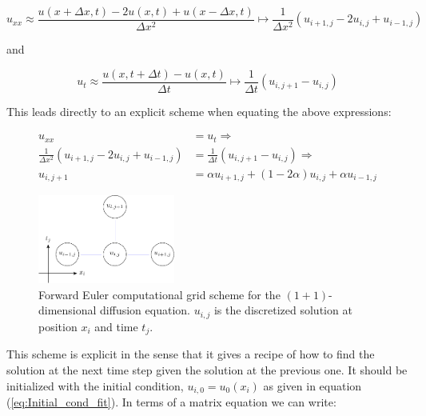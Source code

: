\documentclass[a4paper, 11pt, notitlepage,english]{article}
\begin{document}
\begin{equation}
u_{xx} \approx \frac{u(x+\Delta x,t)-2u(x,t)+u(x-\Delta x, t)}{\Delta x^2} \mapsto \frac{1}{\Delta x^2} (u_{i+1,j}-2u_{i,j}+u_{i-1,j})
\label{eq:Forward_uxx}
\end{equation}

and

\begin{equation}
u_{t} \approx \frac{u(x,t+\Delta t)-u(x, t)}{\Delta t} \mapsto \frac{1}{\Delta t} (u_{i,j+1}-u_{i,j})
\label{eq:Forward_ut}
\end{equation}

This leads directly to an explicit scheme when equating the above expressions:

\begin{align}
u_{xx} &= u_t \Rightarrow \\
 \frac{1}{\Delta x^2} (u_{i+1,j}-2u_{i,j}+u_{i-1,j}) &= \frac{1}{\Delta t} (u_{i,j+1}-u_{i,j}) \Rightarrow \\
 u_{i,j+1} &= \alpha u_{i+1,j} + (1-2\alpha)u_{i,j} + \alpha u_{i-1,j}
\label{eq:Forward_Euler_scheme}
\end{align}

\begin{figure}[h!tb]
 \centering
 \includegraphics[width=0.4\textwidth]{Grid_FE-figure0}
 \caption{Forward Euler computational grid scheme for the $(1+1)$-dimensional diffusion equation. $u_{i,j}$ is the discretized solution at position $x_i$ and time $t_j$.}
 \label{fig:FE_grid}
\end{figure}

This scheme is explicit in the sense that it gives a recipe of how to find the solution at the next time step given the solution at the previous one. It should be initialized with the initial condition, $u_{i,0} = u_0(x_i)$ as given in equation (\ref{eq:Initial_cond_fit}). In terms of a matrix equation we can write:
\end{document}
